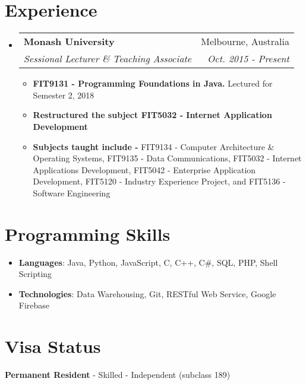 \documentclass[letterpaper,11pt]{article}
\makeatletter
\newcommand{\resumeItem}[2]{
  \item\small{
    {#1}{ #2 \vspace{-2pt}}
  }
}
\newcommand{\resumeSubheading}[4]{
  \vspace{-1pt}\item
    \begin{tabular*}{0.97\textwidth}[t]{l@{\extracolsep{\fill}}r}
      \textbf{#1} & #2 \\
      \textit{\small#3} & \textit{\small #4} \\
    \end{tabular*}\vspace{-5pt}
}
\newcommand{\resumeSubItem}[2]{\resumeItem{#1}{#2}\vspace{-4pt}}
\newcommand{\resumeSubHeadingListStart}{\begin{itemize}[leftmargin=*]}
\newcommand{\resumeSubHeadingListEnd}{\end{itemize}}
\newcommand{\resumeItemListStart}{\begin{itemize}}
\newcommand{\resumeItemListEnd}{\end{itemize}\vspace{-5pt}}
\makeatother
\begin{document}
\section{Experience}
  \resumeSubHeadingListStart
    \resumeSubheading
      {Monash University}{Melbourne, Australia}
      {Sessional Lecturer \& Teaching Associate}{Oct. 2015 - Present}
      \newline
      \resumeItemListStart
        \resumeItem{\textbf{FIT9131 - Programming Foundations in Java.}}
        {Lectured for Semester 2, 2018}
        \resumeItem{\textbf{Restructured the subject FIT5032 - Internet Application Development}}
        {}
        \resumeItem{\textbf{Subjects taught include - }}{FIT9134 - Computer Architecture \& Operating Systems,
         FIT9135 - Data Communications, 
         FIT5032 - Internet Applications Development,
         FIT5042 - Enterprise Application Development, 
         FIT5120 - Industry Experience Project,
         and
         FIT5136 - Software Engineering}       
      \resumeItemListEnd
  \resumeSubHeadingListEnd


%
\section{Programming Skills}
 \resumeSubHeadingListStart
   \item{
     \textbf{Languages}{: Java, Python, JavaScript, C, C++, C\#, SQL, PHP, Shell Scripting}     
   }
   \item{
    \textbf{Technologies}{: Data Warehousing, Git, RESTful Web Service, Google Firebase}
   }
 \resumeSubHeadingListEnd

 \section{Visa Status}
 \textbf{Permanent Resident} - Skilled - Independent (subclass 189)

\end{document}
